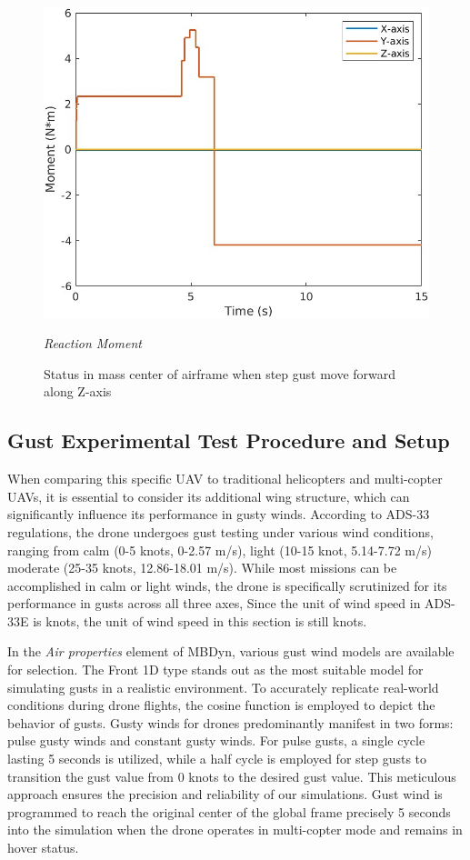 \begin{figure}[htbp]
\begin{minipage}[b]{0.3\textwidth}
    \centering
    \includegraphics[width=\textwidth]{Images/Gust/FIXED/3 moment_4.jpg}
    \caption*{\textit{Reaction Moment}}
  \end{minipage}
  \caption{Status in mass center of airframe when step gust move forward along Z-axis}
  \label{fig:fixed z}
\end{figure}

\subsection{Gust Experimental Test Procedure and Setup}

When comparing this specific UAV to traditional helicopters and multi-copter UAVs, it is essential to consider its additional wing structure, which can significantly influence its performance in gusty winds. According to ADS-33 regulations, the drone undergoes gust testing under various wind conditions, ranging from calm (0-5 knots, 0-2.57 m/s), light (10-15 knot, 5.14-7.72 m/s)  moderate (25-35 knots, 12.86-18.01 m/s). While most missions can be accomplished in calm or light winds, the drone is specifically scrutinized for its performance in gusts across all three axes, Since the unit of wind speed in ADS-33E is knots, the unit of wind speed in this section is still knots.

In the \textit{Air properties} element of MBDyn, various gust wind models are available for selection. The Front 1D type stands out as the most suitable model for simulating gusts in a realistic environment. To accurately replicate real-world conditions during drone flights, the cosine function is employed to depict the behavior of gusts. Gusty winds for drones predominantly manifest in two forms: pulse gusty winds and constant gusty winds. For pulse gusts, a single cycle lasting 5 seconds is utilized, while a half cycle is employed for step gusts to transition the gust value from 0 knots to the desired gust value. This meticulous approach ensures the precision and reliability of our simulations. Gust wind is programmed to reach the original center of the global frame precisely 5 seconds into the simulation when the drone operates in multi-copter mode and remains in hover status.

